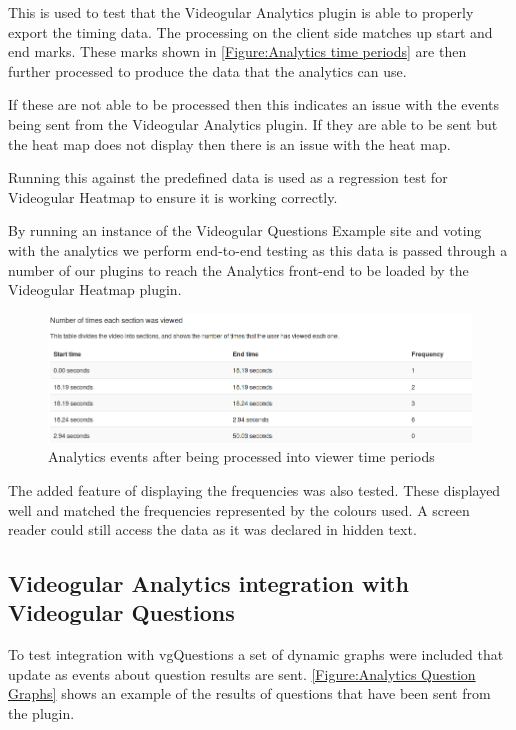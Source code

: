 This is used to test that the \gls{Videogular} Analytics plugin is able to properly export the timing data. The processing on the client side matches up start and end marks. These marks shown in \autoref{Figure:Analytics time periods} are then further processed to produce the data that the analytics can use.

If these are not able to be processed then this indicates an issue with the events being sent from the \gls{Videogular} Analytics plugin. If they are able to be sent but the heat map does not display then there is an issue with the heat map.

Running this against the predefined data is used as a regression test for \gls{Videogular} Heatmap to ensure it is working correctly.

By running an instance of the Videogular Questions Example site and voting with the analytics we perform end-to-end testing as this data is passed through a number of our plugins to reach the Analytics front-end to be loaded by the \gls{Videogular} Heatmap plugin.

\begin{figure}[h]
	\centering
		\includegraphics[scale=0.4]{../figures/analytics_time_periods.png}
	\caption{\label{Figure:Analytics time periods} Analytics events after being processed into viewer time periods}
\end{figure}

The added feature of displaying the frequencies was also tested. These displayed well and matched the frequencies represented by the colours used. A screen reader could still access the data as it was declared in hidden text.

\subsection{Videogular Analytics integration with Videogular Questions}

To test integration with \gls{vgQuestions} a set of dynamic graphs were included that update as events about question results are sent. \autoref{Figure:Analytics Question Graphs} shows an example of the results of questions that have been sent from the plugin.

